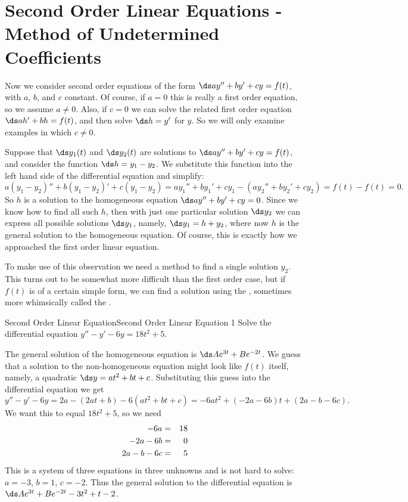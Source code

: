 \section{Second Order Linear Equations - Method of Undetermined Coefficients}{}{}\label{sec:second order linear equations}
Now we consider second order equations of the form $\ds ay''+by'+cy=f(t)$,
with $a$, $b$, and $c$ constant. Of course, if $a=0$ this
is really a first order equation, so we assume $a\not=0$.
Also, if $c=0$ we can solve
the related first order equation $\ds ah'+bh=f(t)$, and then solve
$\ds h=y'$ for $y$. So we will only examine examples in which
$c\not=0$.

Suppose that
$\ds y_1(t)$ and $\ds y_2(t)$ are solutions to $\ds ay''+by'+cy=f(t)$,
and consider the function $\ds h=y_1-y_2$. We substitute
this function into the left hand side of the differential equation and
simplify: 
$$
a(y_1-y_2)''+b(y_1-y_2)'+c(y_1-y_2)=ay_1''+by_1'+cy_1 -
(ay_2''+by_2'+cy_2)=f(t)-f(t)=0.
$$ 
So $h$ is a solution to the homogeneous equation $\ds ay''+by'+cy=0$.
Since we know how to find all such $h$, then with
just one particular solution $\ds y_2$ we can express all possible
solutions $\ds y_1$, namely, $\ds y_1=h+y_2$, where now $h$ is the
general solution to the homogeneous equation. Of course, this is
exactly how we approached the first order linear equation.

To make use of this observation we need a method to find a single
solution $y_2$. This turns out to be somewhat more difficult than the
first order case, but if $f(t)$ is of a certain simple form, we can
find a solution using the 
, sometimes 
more whimsically called the
.

\begin{example}{Second Order Linear Equation}{Second Order Linear Equation 1}\label{Second Order Linear Equation 1}
 Solve the differential equation 
$y''-y'-6y=18t^2+5.$
\end{example}

\begin{solution}
The general solution of the homogeneous equation is
$\ds Ae^{3t}+Be^{-2t}$. We guess that a solution to the
non-homogeneous equation might look like $f(t)$ itself, namely,
a quadratic $\ds y=at^2+bt+c$. Substituting this guess into the
differential equation we get
$$
y''-y'-6y = 2a-(2at+b)-6(at^2+bt+c) = -6at^2+(-2a-6b)t+(2a-b-6c).
$$
We want this to equal $18t^2+5$, so we need 
\begin{eqnarray*}
-6a&=&18\cr
-2a-6b&=&0\cr
2a-b-6c&=&5
\end{eqnarray*}
This is a system of three equations in three unknowns and is not hard
to solve: $a=-3$, $b=1$, $c=-2$. Thus the general solution to the
differential equation is $\ds Ae^{3t}+Be^{-2t}-3t^2+t-2$.
\end{solution}

